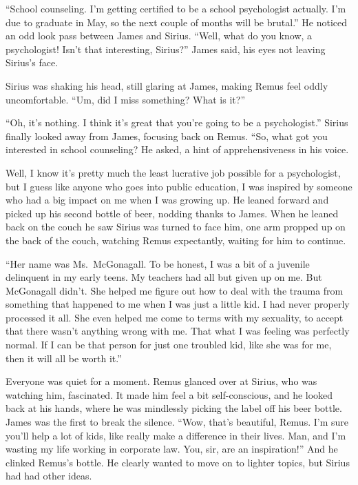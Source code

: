 \documentclass[12pt,twoside,openright]{memoir}
\begin{document}
``School counseling. I'm getting certified to be a school psychologist actually. I'm due to graduate in May, so the next couple of months will be brutal.'' He noticed an odd look pass between James and Sirius. ``Well, what do you know, a psychologist! Isn't that interesting, Sirius?'' James said, his eyes not leaving Sirius's face.

Sirius was shaking his head, still glaring at James, making Remus feel oddly uncomfortable. ``Um, did I miss something?
What is it?''

``Oh, it's nothing. I think it's great that you're going to be a psychologist.'' Sirius finally looked away from James, focusing back on Remus. ``So, what got you interested in school counseling?{\textquotedbl} He asked, a hint of apprehensiveness in his voice.

{\textquotedbl}Well, I know it's pretty much the least lucrative job possible for a psychologist, but I guess like anyone who goes into public education, I was inspired by someone who had a big impact on me when I was growing up.{\textquotedbl} He leaned forward and picked up his second bottle of beer, nodding thanks to James. When he leaned back on the couch he saw Sirius was turned to face him, one arm propped up on the back of the couch, watching Remus expectantly, waiting for him to continue.

``Her name was Ms.\ McGonagall. To be honest, I was a bit of a juvenile delinquent in my early teens. My teachers had all but given up on me. But McGonagall didn't. She helped me figure out how to deal with the trauma from something that happened to me when I was just a little kid. I had never properly processed it all. She even helped me come to terms with my sexuality, to accept that there wasn't anything wrong with me. That what I was feeling was perfectly normal. If I can be that person for just one troubled kid, like she was for me, then it will all be worth it.''

Everyone was quiet for a moment. Remus glanced over at Sirius, who was watching him, fascinated. It made him feel a bit self-conscious, and he looked back at his hands, where he was mindlessly picking the label off his beer bottle. James was the first to break the silence. ``Wow, that's beautiful, Remus. I'm sure you'll help a lot of kids, like really make a difference in their lives. Man, and I'm wasting my life working in corporate law. You, sir, are an inspiration!'' And he clinked Remus's bottle. He clearly wanted to move on to lighter topics, but Sirius had had other ideas.
\end{document}
